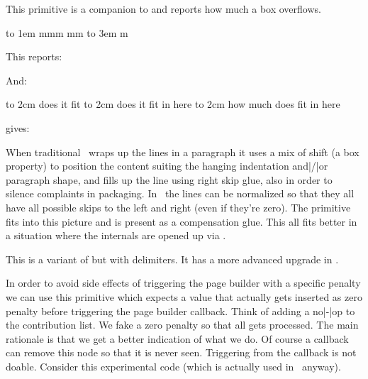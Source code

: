 This primitive is a companion to  and reports how much a box
overflows.

\startbuffer
{}\hbox to 1em {mmm} \the\badness\quad\the\overshoot
{}\hbox         {mm} \the\badness\quad\the\overshoot
{}\hbox to 3em   {m} \the\badness\quad\the\overshoot
\stopbuffer

\typebuffer

This reports:

\startlines
\getbuffer
\stoplines

And:

\startbuffer
\hbox to 2cm {does it fit}               \the\overshoot
\hbox to 2cm {does it fit in here}       \the\overshoot
\hbox to 2cm {how much does fit in here} \the\overshoot
\stopbuffer

\typebuffer

gives:

\startlines
\getbuffer
\stoplines

When traditional \TEX\ wraps up the lines in a paragraph it uses a mix of shift
(a box property) to position the content suiting the hanging indentation and|/|or
paragraph shape, and fills up the line using right skip glue, also in order to
silence complaints in packaging. In \LUAMETATEX\ the lines can be normalized so
that they all have all possible skips to the left and right (even if they're
zero). The  primitive fits into this picture and is present as a
compensation glue. This all fits better in a situation where the internals are
opened up via \LUA.

\stopnewprimitive

\startoldprimitive[title={\prm {overwithdelims}}][obsolete=yes]

This is a variant of  but with delimiters. It has a more advanced
upgrade in .

\stopoldprimitive

\startnewprimitive[title={\prm {pageboundary}}]

In order to avoid side effects of triggering the page builder with a specific
penalty we can use this primitive which expects a value that actually gets
inserted as zero penalty before triggering the page builder callback. Think of
adding a no|-|op to the contribution list. We fake a zero penalty so that all
gets processed. The main rationale is that we get a better indication of what we
do. Of course a callback can remove this node so that it is never seen.
Triggering from the callback is not doable. Consider this experimental code
(which is actually used in \CONTEXT\ anyway).

